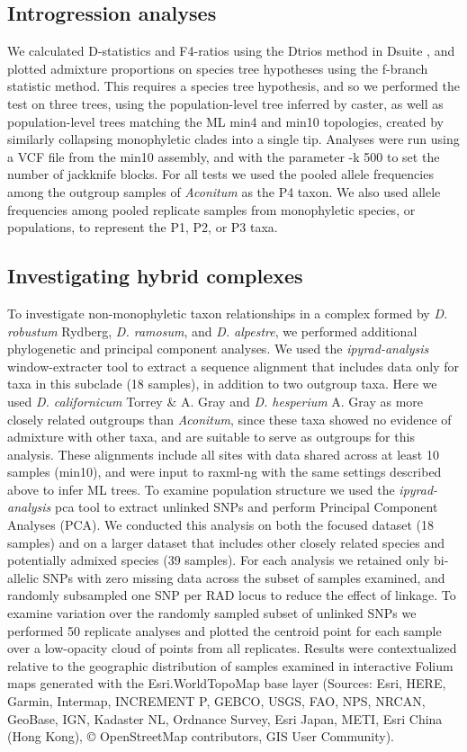 \documentclass[11pt]{article}
\begin{document}
\subsection{Introgression analyses}
We calculated D-statistics \citep{durand_testing_2011} and F4-ratios using the
Dtrios method in Dsuite \citep{malinsky_dsuite_2021}, and plotted admixture 
proportions on species tree hypotheses using the f-branch statistic method.
This requires a species tree hypothesis, and so we performed the test 
on three trees, using the population-level tree inferred by caster, as well as population-level trees matching the ML min4 and min10 topologies, created by similarly collapsing monophyletic clades into a single tip.
Analyses were run using a VCF file from the min10 assembly, and with the 
parameter -k 500 to set the number of jackknife blocks.
% 
For all tests we used the pooled allele frequencies among the outgroup samples 
of \emph{Aconitum} as the P4 taxon. We also used allele frequencies among pooled
replicate samples from monophyletic species, or populations, to represent the P1, P2, or P3 taxa. 
% 


\subsection{Investigating hybrid complexes}
To investigate non-monophyletic taxon relationships in a complex formed 
by \emph{D. robustum} Rydberg, \emph{D. ramosum}, and \emph{D. alpestre}, 
we performed additional phylogenetic and principal component analyses.
% 
We used the \emph{ipyrad-analysis} window-extracter tool to extract a sequence 
alignment that includes data only for taxa in this subclade (18 samples), 
in addition to two outgroup taxa. 
Here we used \emph{D. californicum} Torrey \& A. Gray and \emph{D. hesperium} A. Gray as more closely 
related outgroups than \emph{Aconitum}, since these taxa showed no evidence
of admixture with other taxa, and are suitable to serve as outgroups for this analysis.
% 
These alignments include all sites with data shared across at least 10 
samples (min10), and were input to raxml-ng with the same settings described
above to infer ML trees. 
% 
To examine population structure we used the \emph{ipyrad-analysis} pca tool to 
extract unlinked SNPs and perform Principal Component Analyses (PCA). 
% 
We conducted this analysis on both the focused dataset (18 samples) and on a
larger dataset that includes other closely related species and potentially
admixed species (39 samples).
% 
For each analysis we retained only bi-allelic SNPs with zero missing data across
the subset of samples examined, and randomly subsampled one SNP per RAD locus to
reduce the effect of linkage. 
% 
To examine variation over the randomly sampled subset of unlinked SNPs we 
performed 50 replicate analyses and plotted the centroid point for each sample
over a low-opacity cloud of points from all replicates.
% 
Results were contextualized relative to the geographic distribution of 
samples examined in interactive Folium maps generated with the 
Esri.WorldTopoMap base layer (Sources: Esri, HERE, Garmin, Intermap, 
INCREMENT P, GEBCO, USGS, FAO, NPS, NRCAN, GeoBase, IGN, Kadaster NL, 
Ordnance Survey, Esri Japan, METI, Esri China (Hong Kong), © OpenStreetMap 
contributors, GIS User Community).
\end{document}
